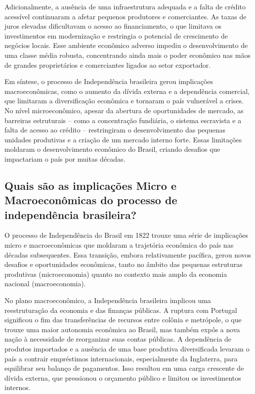 \documentclass[a4paper,12pt]{article}[abntex2]
\begin{document}
Adicionalmente, a ausência de uma infraestrutura adequada e a falta de crédito acessível continuaram a afetar pequenos produtores e comerciantes. As taxas de juros elevadas dificultavam o acesso ao financiamento, o que limitava os investimentos em modernização e restringia o potencial de crescimento de negócios locais. Esse ambiente econômico adverso impediu o desenvolvimento de uma classe média robusta, concentrando ainda mais o poder econômico nas mãos de grandes proprietários e comerciantes ligados ao setor exportador.

Em síntese, o processo de Independência brasileira gerou implicações macroeconômicas, como o aumento da dívida externa e a dependência comercial, que limitaram a diversificação econômica e tornaram o país vulnerável a crises. No nível microeconômico, apesar da abertura de oportunidades de mercado, as barreiras estruturais – como a concentração fundiária, o sistema escravista e a falta de acesso ao crédito – restringiram o desenvolvimento das pequenas unidades produtivas e a criação de um mercado interno forte. Essas limitações moldaram o desenvolvimento econômico do Brasil, criando desafios que impactariam o país por muitas décadas.

\subsection{\textbf{Quais são as implicações Micro e Macroeconômicas do processo de independência brasileira?}}

O processo de Independência do Brasil em 1822 trouxe uma série de implicações micro e macroeconômicas que moldaram a trajetória econômica do país nas décadas subsequentes. Essa transição, embora relativamente pacífica, gerou novos desafios e oportunidades econômicas, tanto no âmbito das pequenas estruturas produtivas (microeconomia) quanto no contexto mais amplo da economia nacional (macroeconomia).

No plano macroeconômico, a Independência brasileira implicou uma reestruturação da economia e das finanças públicas. A ruptura com Portugal significou o fim das transferências de recursos entre colônia e metrópole, o que trouxe uma maior autonomia econômica ao Brasil, mas também expôs a nova nação à necessidade de reorganizar suas contas públicas. A dependência de produtos importados e a ausência de uma base produtiva diversificada levaram o país a contrair empréstimos internacionais, especialmente da Inglaterra, para equilibrar seu balanço de pagamentos. Isso resultou em uma carga crescente de dívida externa, que pressionou o orçamento público e limitou os investimentos internos.
\end{document}
